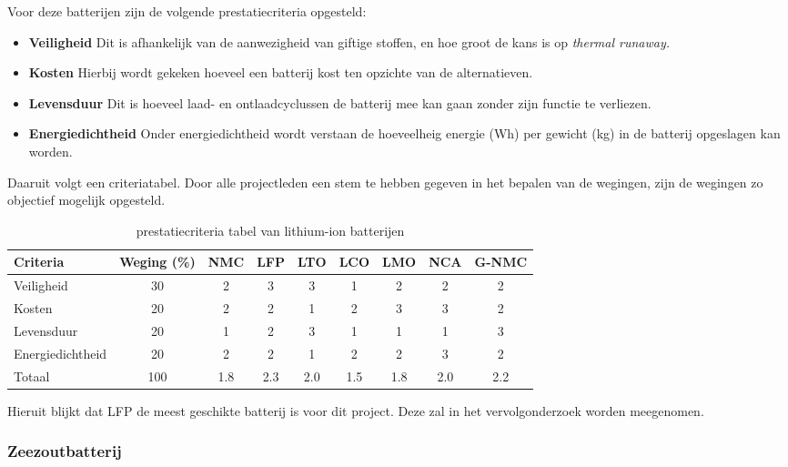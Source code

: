 \noindent Voor deze batterijen zijn de volgende prestatiecriteria opgesteld:

\begin{itemize}
    \item \textbf{Veiligheid} Dit is afhankelijk van de aanwezigheid van giftige stoffen, en hoe groot de kans is op \textit{thermal runaway.}
    \item \textbf{Kosten} Hierbij wordt gekeken hoeveel een batterij kost ten opzichte van de alternatieven.
    \item \textbf{Levensduur} Dit is hoeveel laad- en ontlaadcyclussen de batterij mee kan gaan zonder zijn functie te verliezen.
    \item \textbf{Energiedichtheid} Onder energiedichtheid wordt verstaan de hoeveelheig energie (Wh) per gewicht (kg) in de batterij opgeslagen kan worden.
\end{itemize}



\noindent Daaruit volgt een criteriatabel. Door alle projectleden een stem te hebben gegeven in het bepalen van de wegingen, zijn de wegingen zo objectief mogelijk opgesteld.


\begin{table}[h]
\centering
\caption{prestatiecriteria tabel  van lithium-ion batterijen \cite{Szewczyk2023}}
\begin{tabular}{lcccccccc}
\toprule
Criteria & Weging (\%) & NMC & LFP & LTO & LCO & LMO & NCA & G-NMC \\
\midrule
Veiligheid          & 30 & 2 & 3 & 3 & 1 & 2 & 2 & 2\\
Kosten              & 20 & 2 & 2 & 1 & 2 & 3 & 3 & 2\\
Levensduur          & 20 & 1 & 2 & 3 & 1 & 1 & 1 & 3\\
Energiedichtheid    & 20 & 2 & 2 & 1 & 2 & 2 & 3 & 2\\
Totaal              & 100 & 1.8 & 2.3 & 2.0 & 1.5 & 1.8 & 2.0 & 2.2\\
\bottomrule
\end{tabular}
\label{tab:vergelijking_batterijen}
\end{table}

\noindent Hieruit blijkt dat LFP de meest geschikte batterij is voor dit project. Deze zal in het vervolgonderzoek worden meegenomen.

\subsubsection{\textbf{Zeezoutbatterij}}

